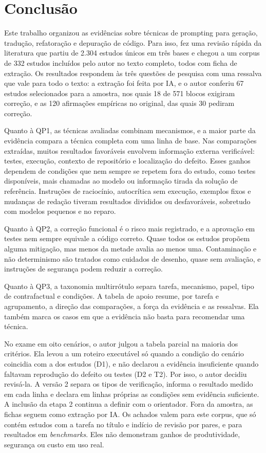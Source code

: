 \section{Conclusão}
Este trabalho organizou as evidências sobre técnicas de prompting para geração, tradução, refatoração e depuração de
código. Para isso, fez uma revisão rápida da literatura que partiu de 2.304 estudos únicos em três bases e chegou a um
corpus de 332 estudos incluídos pelo autor no texto completo, todos com ficha de extração. Os resultados
respondem às três questões de pesquisa com uma ressalva que vale para todo o texto: a extração foi feita por IA,
e o autor
conferiu 67 estudos selecionados para a amostra, nos quais 18 de 571 blocos exigiram correção, e as 120 afirmações empíricas no original, das quais 30 pediram correção.

Quanto à QP1, as técnicas avaliadas combinam mecanismos, e a maior parte da evidência compara a técnica completa com
uma linha de base. Nas comparações extraídas, muitos resultados favoráveis envolvem informação externa
verificável: testes,
execução, contexto de repositório e localização do defeito. Esses ganhos dependem de condições que nem sempre se
repetem fora do estudo, como testes disponíveis, mais chamadas ao modelo ou informação tirada da solução de
referência. Instruções de raciocínio, autocrítica sem execução, exemplos fixos e mudanças de redação tiveram
resultados divididos ou desfavoráveis, sobretudo com modelos pequenos e no reparo.

Quanto à QP2, a correção funcional é o risco mais registrado, e a aprovação em testes nem sempre equivale a código
correto. Quase todos os estudos propõem alguma mitigação, mas menos da metade avalia ao menos uma. Contaminação e
não determinismo são tratados como cuidados de desenho, quase sem avaliação, e instruções de segurança podem reduzir a
correção.

Quanto à QP3, a taxonomia multirrótulo separa tarefa, mecanismo, papel, tipo de contrafactual e condições. A tabela de
apoio resume, por tarefa e agrupamento, a direção das comparações, a força da evidência e as ressalvas. Ela também
marca os casos em que a evidência não basta para recomendar uma técnica.

No exame em oito cenários, o autor julgou a tabela parcial na maioria dos critérios. Ela levou a um roteiro
executável só quando a condição do cenário coincidia com a dos estudos (D1), e não declarou a evidência
insuficiente quando faltavam reprodução do defeito ou testes (D2 e T2). Por isso, o autor decidiu revisá-la. A versão 2
separa os tipos de verificação, informa o resultado medido em cada linha e declara em linhas próprias as
condições sem evidência suficiente. A inclusão da etapa 2 continua a definir com o orientador.
Fora da amostra, as fichas seguem como extração por IA. Os
achados valem para este corpus, que só contém estudos com a tarefa no título e indício de revisão por pares, e para
resultados em \textit{benchmarks}. Eles não demonstram ganhos de produtividade, segurança ou custo em uso real.

